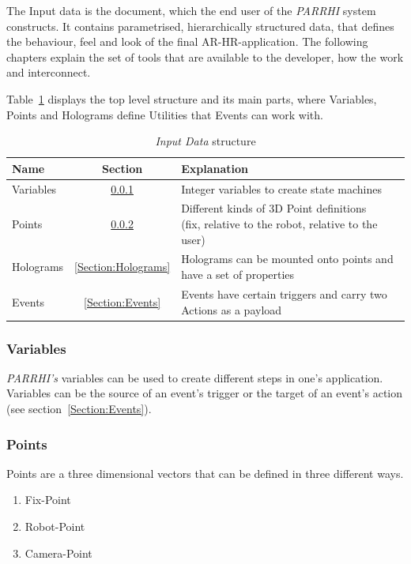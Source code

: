The Input data is the document, which the end user of the \textit{PARRHI} system constructs. It contains parametrised, hierarchically structured data, that defines the behaviour, feel and look of the final AR-HR-application. The following chapters explain the set of tools that are available to the developer, how the work and interconnect.

Table~\ref{Table:InputDataStructure} displays the top level structure and its main parts, where Variables, Points and Holograms define Utilities that Events can work with. 

\begin{table}[ht]
	\caption{\textit{Input Data} structure}
	\label{Table:InputDataStructure}
	\centering
	\begin{tabular}{lcl}
		\toprule
		Name & Section		& Explanation	\\		
		\midrule
		Variables & \ref{Section:Variables}		& Integer variables to create state machines \\
		Points& \ref{Section:Points}		& \parbox[t]{10cm}{Different kinds of 3D Point definitions\\(fix, relative to the robot, relative to the user)} 	 \\
		Holograms& \ref{Section:Holograms} & Holograms can be mounted onto points and have a set of properties\\
		Events& \ref{Section:Events} & Events have certain triggers and carry two Actions as a payload \\
		\bottomrule
	\end{tabular}
\end{table}

\subsubsection{Variables}\label{Section:Variables}
\textit{PARRHI's} variables can be used to create different steps in one's application. Variables can be the source of an event's trigger or the target of an event's action (see section~\ref{Section:Events}).

\subsubsection{Points}\label{Section:Points}
Points are a three dimensional vectors that can be defined in three different ways. 
\begin{enumerate}
	\setlength\itemsep{-1em}
	\item Fix-Point
	\item Robot-Point
	\item Camera-Point
\end{enumerate}

